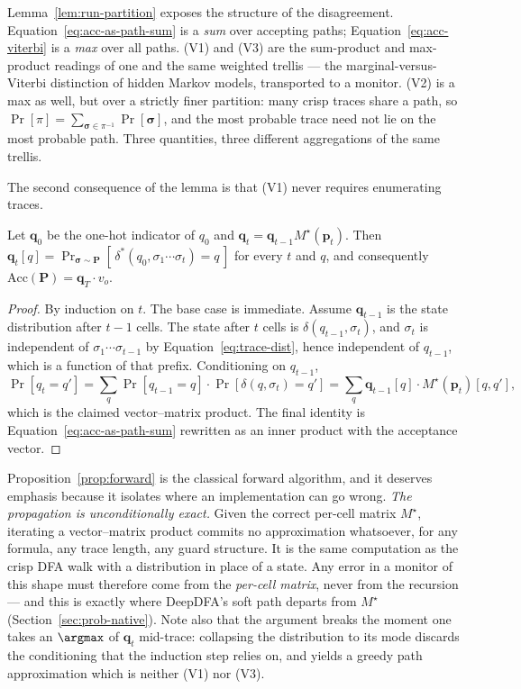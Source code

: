 Lemma~\ref{lem:run-partition} exposes the structure of the disagreement. Equation~\eqref{eq:acc-as-path-sum} is a \emph{sum} over accepting paths; Equation~\eqref{eq:acc-viterbi} is a \emph{max} over all paths. (V1) and (V3) are the sum-product and max-product readings of one and the same weighted trellis --- the marginal-versus-Viterbi distinction of hidden Markov models, transported to a monitor. (V2) is a max as well, but over a strictly finer partition: many crisp traces share a path, so $\Pr[\pi] = \sum_{\boldsymbol{\sigma} \in \pi^{-1}} \Pr[\boldsymbol{\sigma}]$, and the most probable trace need not lie on the most probable path. Three quantities, three different aggregations of the same trellis.

The second consequence of the lemma is that (V1) never requires enumerating traces.

\begin{proposition}
\label{prop:forward}
Let $\mathbf{q}_0$ be the one-hot indicator of $q_0$ and $\mathbf{q}_t = \mathbf{q}_{t-1} M^\star(\mathbf{p}_t)$. Then $\mathbf{q}_t[q] = \Pr_{\boldsymbol{\sigma} \sim \mathbf{P}}[\,\delta^*(q_0, \sigma_1 \cdots \sigma_t) = q\,]$ for every $t$ and $q$, and consequently $\mathrm{Acc}(\mathbf{P}) = \mathbf{q}_T \cdot v_o$.
\end{proposition}

\begin{proof}
By induction on $t$. The base case is immediate. Assume $\mathbf{q}_{t-1}$ is the state distribution after $t-1$ cells. The state after $t$ cells is $\delta(q_{t-1}, \sigma_t)$, and $\sigma_t$ is independent of $\sigma_1 \cdots \sigma_{t-1}$ by Equation~\eqref{eq:trace-dist}, hence independent of $q_{t-1}$, which is a function of that prefix. Conditioning on $q_{t-1}$,
\[
  \Pr[q_t = q'] = \sum_{q} \Pr[q_{t-1} = q] \cdot \Pr[\delta(q, \sigma_t) = q'] = \sum_q \mathbf{q}_{t-1}[q] \cdot M^\star(\mathbf{p}_t)[q,q'],
\]
which is the claimed vector--matrix product. The final identity is Equation~\eqref{eq:acc-as-path-sum} rewritten as an inner product with the acceptance vector.
\end{proof}

Proposition~\ref{prop:forward} is the classical forward algorithm, and it deserves emphasis because it isolates where an implementation can go wrong. \emph{The propagation is unconditionally exact.} Given the correct per-cell matrix $M^\star$, iterating a vector--matrix product commits no approximation whatsoever, for any formula, any trace length, any guard structure. It is the same computation as the crisp DFA walk with a distribution in place of a state. Any error in a monitor of this shape must therefore come from the \emph{per-cell matrix}, never from the recursion --- and this is exactly where DeepDFA's soft path departs from $M^\star$ (Section~\ref{sec:prob-native}). Note also that the argument breaks the moment one takes an $\argmax$ of $\mathbf{q}_t$ mid-trace: collapsing the distribution to its mode discards the conditioning that the induction step relies on, and yields a greedy path approximation which is neither (V1) nor (V3).


